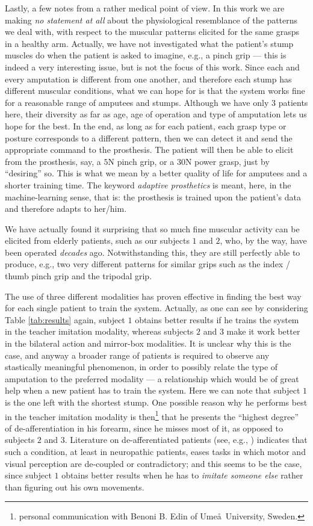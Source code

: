Lastly, a few notes from a rather medical point of view. In this work
we are making \emph{no statement at all} about the physiological
resemblance of the patterns we deal with, with respect to the muscular
patterns elicited for the same grasps in a healthy arm. Actually, we
have not investigated what the patient's stump muscles do when the
patient is asked to imagine, e.g., a pinch grip --- this is indeed a
very interesting issue, but is not the focus of this work. Since each
and every amputation is different from one another, and therefore each
stump has different muscular conditions, what we can hope for is that
the system works fine for a reasonable range of amputees and
stumps. Although we have only $3$ patients here, their diversity as
far as age, age of operation and type of amputation lets us hope for
the best. In the end, as long as for each patient, each grasp type or
posture corresponds to a different pattern, then we can detect it and
send the appropriate command to the prosthesis. The patient will then
be able to elicit from the prosthesis, say, a $5$N pinch grip, or a
$30$N power grasp, just by ``desiring'' so. This is what we mean by a
better quality of life for amputees and a shorter training time. The
keyword \emph{adaptive prosthetics} is meant, here, in the
machine-learning sense, that is: the prosthesis is trained upon the
patient's data and therefore adapts to her/him.

We have actually found it surprising that so much fine muscular
activity can be elicited from elderly patients, such as our subjects
$1$ and $2$, who, by the way, have been operated \emph{decades}
ago. Notwithstanding this, they are still perfectly able to produce,
e.g., two very different patterns for similar grips such as the index
/ thumb pinch grip and the tripodal grip.

The use of three different modalities has proven effective in finding
the best way for each single patient to train the system. Actually, as
one can see by considering Table \ref{tab:results} again, subject $1$
obtains better results if he trains the system in the teacher
imitation modality, whereas subjects $2$ and $3$ make it work better
in the bilateral action and mirror-box modalities. It is unclear why
this is the case, and anyway a broader range of patients is required
to observe any stastically meaningful phenomenon, in order to possibly
relate the type of amputation to the preferred modality --- a
relationship which would be of great help when a new patient has to
train the system. Here we can note that subject $1$ is the one left
with the shortest stump. One possible reason why he performs best in
the teacher imitation modality is then\footnote{personal communication
with Benoni B. Edin of Ume\aa\ University, Sweden.} that he presents
the ``highest degree'' of de-afferentiation in his forearm, since he
misses most of it, as opposed to subjects $2$ and $3$. Literature on
de-afferentiated patients (see, e.g., \cite{lajoie,miall}) indicates
that such a condition, at least in neuropathic patients, eases tasks
in which motor and visual perception are de-coupled or contradictory;
and this seems to be the case, since subject $1$ obtains better
results when he has to \emph{imitate someone else} rather than
figuring out his own movements.
